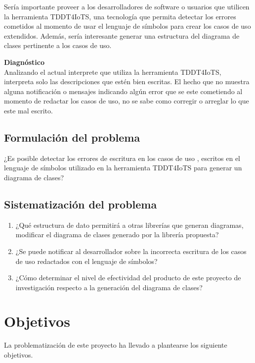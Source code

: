 Sería importante proveer a los desarrolladores de software o usuarios que utilicen la herramienta TDDT4IoTS, una tecnología que permita detectar los errores cometidos al momento de usar el lenguaje de símbolos para crear los casos de uso extendidos. Además, sería interesante generar una estructura del diagrama de clases pertinente a los casos de uso.

\textbf{Diagnóstico} \\
Analizando el actual interprete que utiliza la herramienta TDDT4IoTS, interpreta solo las descripciones que estén bien escritas. El hecho que no muestra alguna notificación o mensajes indicando algún error que se este cometiendo al momento de redactar los casos de uso, no se sabe como corregir o arreglar lo que este mal escrito. 

\subsection{Formulación del problema}

¿Es posible detectar los errores de escritura en los casos de uso , escritos en el lenguaje de símbolos utilizado en la herramienta TDDT4IoTS para generar un diagrama de clases?

\subsection{Sistematización del problema}

\begin{enumerate}
	\item ¿Qué estructura de dato permitirá a otras librerías que generan diagramas, modificar el diagrama de clases generado por la librería propuesta?
	
	\item ¿Se puede notificar al desarrollador sobre la incorrecta escritura de los casos de uso redactados con el lenguaje de símbolos?
	
	\item ¿Cómo determinar el nivel de efectividad del producto de este proyecto de investigación respecto a la generación del diagrama de clases?
\end{enumerate}

\section{Objetivos}

La problematización de este proyecto ha llevado a plantearse los siguiente objetivos.

